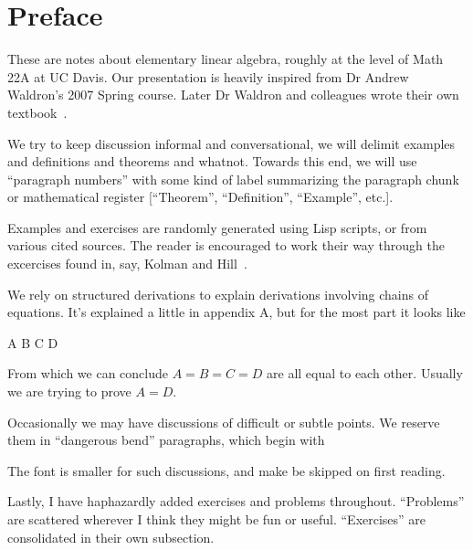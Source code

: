 \section*{Preface}

These are notes about elementary linear algebra, roughly at the level of
Math 22A at UC Davis. Our presentation is heavily inspired from Dr
Andrew Waldron's 2007 Spring course. Later Dr Waldron and colleagues
wrote their own textbook~\cite{waldron}.

We try to keep discussion informal and conversational, we will delimit
examples and definitions and theorems and whatnot. Towards this end, we
will use ``paragraph numbers'' with some kind of label summarizing the
paragraph chunk or mathematical register [``Theorem'', ``Definition'',
``Example'', etc.].

Examples and exercises are randomly generated using Lisp scripts, or
from various cited sources. The reader is encouraged to work their way
through the excercises found in, say, Kolman and Hill~\cite{kolman}.

We rely on structured derivations to explain derivations involving
chains of equations. It's explained a little in appendix A, but for the
most part it looks like
\begin{calculation}
  A
  B
  C
  D
\end{calculation}
From which we can conclude $A=B=C=D$ are all equal to each
other. Usually we are trying to prove $A=D$.

Occasionally we may have discussions of difficult or subtle points. We
reserve them in ``dangerous bend'' paragraphs, which begin with
\begin{center}
  \dbend\smallbreak
\end{center}
The font is smaller for such discussions, and make be skipped on first
reading.

Lastly, I have haphazardly added exercises and problems
throughout. ``Problems'' are scattered wherever I think they might be
fun or useful. ``Exercises'' are consolidated in their own subsection.